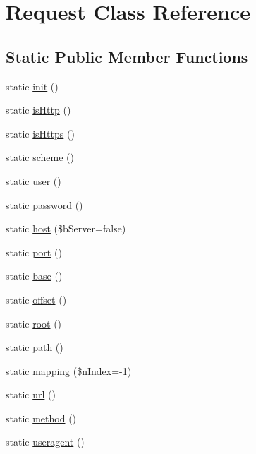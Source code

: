 \hypertarget{class_request}{\section{Request Class Reference}
\label{class_request}
}
\subsection*{Static Public Member Functions}
\begin{DoxyCompactItemize}
\item 
static \hyperlink{class_request_a0552dcea819c77f239bb6db060e17b47}{init} ()
\item 
static \hyperlink{class_request_a8d58147bb9572424021c44b0ebb3f85a}{is\-Http} ()
\item 
static \hyperlink{class_request_afab6f7cb93efa72b28f3e8b2eba901dd}{is\-Https} ()
\item 
static \hyperlink{class_request_a23d8c8dfb64e8f03ba857e83887a3f93}{scheme} ()
\item 
static \hyperlink{class_request_a512dd9b95abef2346ad3af2e593d10c1}{user} ()
\item 
static \hyperlink{class_request_a1ad0dec68fffe32c3b59e5130b63c1ba}{password} ()
\item 
static \hyperlink{class_request_a291eeae48e2675a5301279b0e1b8d8e2}{host} (\$b\-Server=false)
\item 
static \hyperlink{class_request_a495e06b9d24638c678259b6f3aefbcd6}{port} ()
\item 
static \hyperlink{class_request_aca04f9b433bb568c10d32ee114a0d02c}{base} ()
\item 
static \hyperlink{class_request_a64f9327ac4a815b3f114d50fd6ba521b}{offset} ()
\item 
static \hyperlink{class_request_a6b69986e47c94186cce2336f11ad1f6e}{root} ()
\item 
static \hyperlink{class_request_ae1725b521b1833602f3f554566142c51}{path} ()
\item 
static \hyperlink{class_request_ada5f08ac6d1754ad0cc7312c10b8c9a3}{mapping} (\$n\-Index=-\/1)
\item 
static \hyperlink{class_request_abf1e0caab3f4027d508eec81489b260b}{url} ()
\item 
static \hyperlink{class_request_a4d6813e2943a1ced4ae7159e3a382695}{method} ()
\item 
static \hyperlink{class_request_a12099938e1500f4559b32b833de2088e}{useragent} ()
\item 

\end{DoxyCompactItemize}
